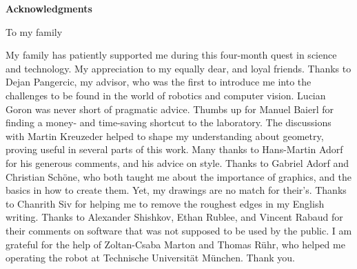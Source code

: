 \clearemptydoublepage
{}	



\vspace*{2cm}

\begin{center}
{\Large \bf Acknowledgments}
\end{center}

\vspace{1cm}

\begin{center}
    To my family
\vspace{1cm}
\end{center}


\vspace{1cm}


My family has patiently supported me during this four-month quest in science and
technology. My appreciation to my equally dear, and loyal friends. Thanks to
Dejan Pangercic, my advisor, who was the first to introduce me into the
challenges to be found in the world of robotics and computer vision. Lucian
Goron was never short of pragmatic advice. Thumbs up for Manuel Baierl for
finding a money- and time-saving shortcut to the laboratory. The discussions
with Martin Kreuzeder helped to shape my understanding about geometry, proving
useful in several parts of this work.  Many thanks to Hans-Martin Adorf for his
generous comments, and his advice on style.  Thanks to Gabriel Adorf and
Christian Schöne, who both taught me about the importance of graphics, and the
basics in how to create them. Yet, my drawings are no match for their's. Thanks
to Chanrith Siv for helping me to remove the roughest edges in my English
writing.  Thanks to Alexander Shishkov, Ethan Rublee, and Vincent Rabaud for
their comments on software that was not supposed to be used by the public. I am
grateful for the help of Zoltan-Csaba Marton and Thomas Rühr, who helped me
operating the robot at Technische Universität München. Thank you.

